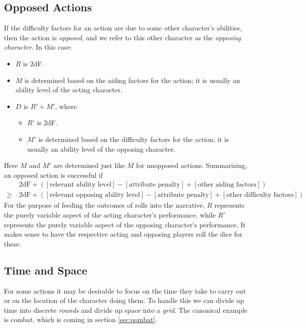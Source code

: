 \documentclass[12pt]{article}
\begin{document}
\subsection{Opposed Actions}\label{sec:opposed}
If the difficulty factors for an action are due to some other character's abilities,
then the action is \emph{opposed}, and we refer to this other character as the \emph{opposing character}.
In this case:
\vspace{-1em}
\begin{itemize}
\item $R$ is $2$dF.
\item $M$ is determined based on the aiding factors for the action; it is usually an ability level of the acting character.
\item $D$ is $R' + M'$, where
\begin{itemize}
\item $R'$ is $2$dF.
\item $M'$ is determined based on the difficulty factors for the action; it is usually an ability level of the opposing character.
\end{itemize}
\end{itemize}
Here $M$ and $M'$ are determined just like $M$ for unopposed actions.
Summarizing, an opposed action is successful if
\begin{align*}
&2\text{dF}
+([\text{relevant ability level}]
-[\text{attribute penalty}]
+[\text{other aiding factors}])\\
\geq\ & 
2\text{dF}
+([\text{relevant opposing ability level}]
-[\text{attribute penalty}]
+[\text{other difficulty factors}]).
\end{align*}
For the purpose of feeding the outcomes of rolls into the narrative,
$R$ represents the purely variable aspect of the acting character's performance,
while $R'$ represents the purely variable aspect of the opposing character's performance.
It makes sense to have the respective acting and opposing players roll the dice for these.


\subsection{Time and Space}

For some actions it may be desirable to focus on the time they take to carry out
or on the location of the character doing them.
To handle this we can divide up time into discrete \emph{rounds} and divide up space into a \emph{grid}.
The canonical example is combat, which is coming in section \ref{sec:qombat}.
\end{document}
